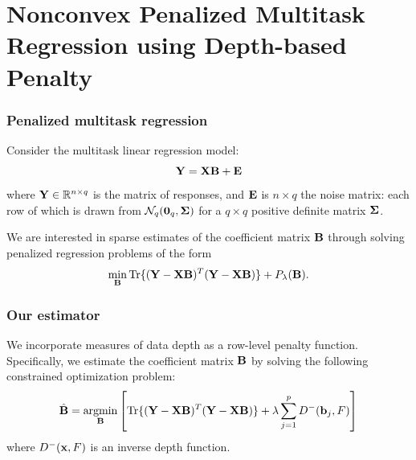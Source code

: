 \documentclass[handout,10pt]{beamer}
\DeclareMathOperator*{\Tr}{Tr}
\DeclareMathOperator*{\argmin}{argmin}
\begin{document}

\section{Nonconvex Penalized Multitask Regression using Depth-based Penalty}


\begin{frame}
\frametitle{Penalized multitask regression}
Consider the multitask linear regression model:
%
$$ {\mathbf{Y}} = {\mathbf{X}} {\mathbf{B}} + {\mathbf{E}} $$
%
where ${\mathbf{Y}} \in \mathbb R^{n\times q}$ is the matrix of responses, and ${\mathbf{E}}$ is $n\times q$ the noise matrix: each row of which is drawn from $\mathcal{N}_q ({\bf 0}_q, {\boldsymbol{\Sigma}})$ for a $q \times q$ positive definite matrix ${\boldsymbol{\Sigma}}$.

\vspace{2em}

We are interested in sparse estimates of the coefficient matrix ${\mathbf{B}}$ through solving penalized regression problems of the form
%
\begin{equation}\label{eqn:penEqn}
\min_\bfB \Tr \{ (\bfY - \bfX\bfB)^T ( \bfY - \bfX\bfB) \} + P_\lambda(\bfB).
\end{equation}
%

\end{frame}
\begin{frame}
\frametitle{Our estimator}
We incorporate measures of data depth as a row-level penalty function. Specifically, we estimate the coefficient matrix ${\mathbf{B}}$ by solving the following constrained optimization problem:
%
$$
\hat\bfB = \argmin_\bfB \left[ \Tr \{ (\bfY - \bfX\bfB)^T ( \bfY - \bfX\bfB) \} + \lambda \sum_{j=1}^p D^-( \bfb_j, F) \right]
$$
%
where $D^-( {\bf{x}}, F)$ is an inverse depth function.

\end{frame}

\end{document}
